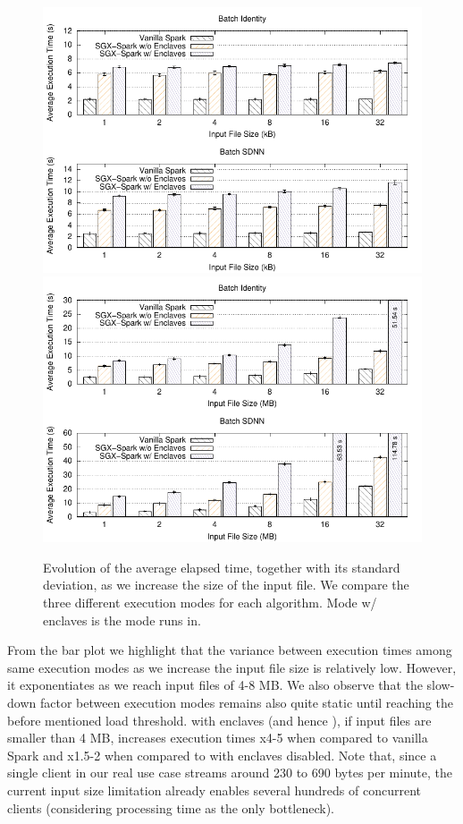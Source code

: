 \begin{figure}[h!]
    \centering
    \includegraphics[width=.85\textwidth]{plots/batch/input_size/input_size.pdf}
    \includegraphics[width=.85\textwidth]{plots/batch/input_size/big_input_size.pdf}
    \caption[Evolution of the average elapsed time as the input workload increases.]{Evolution of the average elapsed time, together with its standard deviation, as we increase the size of the input file. We compare the three different execution modes for each algorithm. Mode \sgxspark w/ enclaves is the mode \projName runs in. \label{fig:batch-input-size}}
\end{figure}

From the bar plot we highlight that the variance between execution times among same execution modes as we increase the input file size is relatively low. 
However, it exponentiates as we reach input files of 4-8 MB.
We also observe that the slow-down factor between execution modes remains also quite static until reaching the before mentioned load threshold. 
\sgxspark with enclaves (and hence \projName), if input files are smaller than 4 MB, increases execution times x4-5 when compared to vanilla Spark and x1.5-2 when compared to \sgxspark with enclaves disabled.
Note that, since a single client in our real use case streams around 230 to 690 bytes per minute, the current input size limitation already enables several hundreds of concurrent clients (considering processing time as the only bottleneck).

